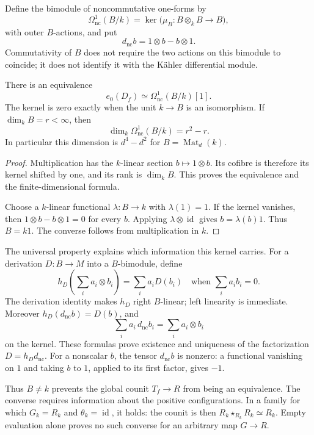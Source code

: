 Define the bimodule of noncommutative one-forms by
\[
 \Omega^1_{\mathrm{nc}}(B/k)
 =\ker\bigl(\mu_B:B\otimes_k B\to B\bigr),
\]
with outer \(B\)-actions, and put
\[
 d_{\mathrm{nc}}b=1\otimes b-b\otimes1.
\]
Commutativity of \(B\) does not require the two actions on this bimodule
to coincide; it does not identify it with the K\"ahler differential module.

\begin{proposition}\label{v4-prop:empty-seam-defect}
There is an equivalence
\[
 e_0(D_f)\simeq \Omega^1_{\mathrm{nc}}(B/k)[1].
\]
The kernel is zero exactly when the unit \(k\to B\) is an isomorphism.
If \(\dim_kB=r<\infty\), then
\[
 \dim_k\Omega^1_{\mathrm{nc}}(B/k)=r^2-r.
\]
In particular this dimension is \(d^4-d^2\) for
\(B=\operatorname{Mat}_d(k)\).
\end{proposition}

\begin{proof}
Multiplication has the \(k\)-linear section \(b\mapsto1\otimes b\).
Its cofibre is therefore its kernel shifted by one, and its rank is
\(\dim_kB\). This proves the equivalence and the finite-dimensional
formula.

Choose a \(k\)-linear functional \(\lambda:B\to k\) with
\(\lambda(1)=1\). If the kernel vanishes, then
\(1\otimes b-b\otimes1=0\) for every \(b\).
Applying \(\lambda\otimes\operatorname{id}\) gives \(b=\lambda(b)1\).
Thus \(B=k1\). The converse follows from multiplication in \(k\).
\end{proof}

The universal property explains which information this kernel carries.
For a derivation \(D:B\to M\) into a \(B\)-bimodule, define
\[
 h_D\left(\sum_i a_i\otimes b_i\right)=\sum_i a_iD(b_i)
 \quad\text{when }\sum_i a_ib_i=0.
\]
The derivation identity makes \(h_D\) right \(B\)-linear; left
linearity is immediate. Moreover
\(h_D(d_{\mathrm{nc}}b)=D(b)\), and
\[
 \sum_i a_i\,d_{\mathrm{nc}}b_i
 =\sum_i a_i\otimes b_i
\]
on the kernel. These formulas prove existence and uniqueness of the
factorization \(D=h_Dd_{\mathrm{nc}}\).
For a nonscalar \(b\), the tensor \(d_{\mathrm{nc}}b\) is nonzero:
a functional vanishing on \(1\) and taking \(b\) to \(1\), applied
to its first factor, gives \(-1\).

Thus \(B\ne k\) prevents the global counit \(T_f\to R\) from being
an equivalence. The converse requires information about the positive
configurations. In a family for which \(G_k=R_k\) and
\(\theta_k=\operatorname{id}\), it holds: the counit is then
\(R_k\star_{R_k}R_k\simeq R_k\). Empty evaluation alone proves no
such converse for an arbitrary map \(G\to R\).

